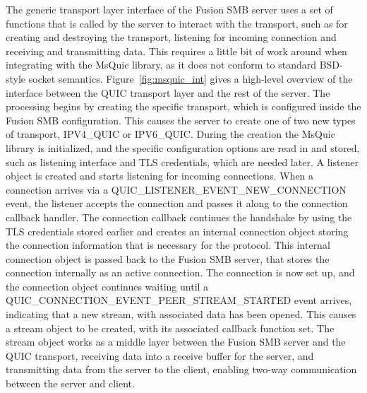 \documentclass[english, 12pt, a4paper, elec, utf8, a-2b, online]{aaltothesis}
\begin{document}
The generic transport layer interface of the Fusion SMB server uses a set of functions
that is called by the server to interact with the transport, such as for creating and
destroying the transport, listening for incoming connection and receiving and transmitting data.
This requires a little bit of work around when integrating with the MsQuic library, as
it does not conform to standard BSD-style socket semantics. Figure~\ref{fig:msquic_int}
gives a high-level overview of the interface between the QUIC transport layer and the
rest of the server. The processing begins by creating the specific transport, which
is configured inside the Fusion SMB configuration. This causes the server to create
one of two new types of transport, IPV4\_QUIC or IPV6\_QUIC. During the creation the MsQuic
library is initialized, and the specific configuration options are read in and stored,
such as listening interface and TLS credentials, which are needed later. A listener
object is created and starts listening for incoming connections. When a connection
arrives via a QUIC\_LISTENER\_EVENT\_NEW\_CONNECTION event, the listener accepts the
connection and passes it along to the
connection callback handler. The connection callback continues the handshake by using the TLS
credentials stored earlier and creates an internal connection object storing
the connection information that is necessary for the protocol. This internal connection
object is passed back to the Fusion SMB server, that stores the connection internally
as an active connection. The connection is now set up, and the connection object continues waiting
until a QUIC\_CONNECTION\_EVENT\_PEER\_STREAM\_STARTED event arrives, indicating
that a new stream, with associated data has been opened. This causes a stream object
to be created, with its associated callback function set. The stream object works
as a middle layer between the Fusion SMB server and the QUIC transport, receiving
data into a receive buffer for the server, and transmitting data from the server to
the client, enabling two-way communication between the server and client.
\end{document}
